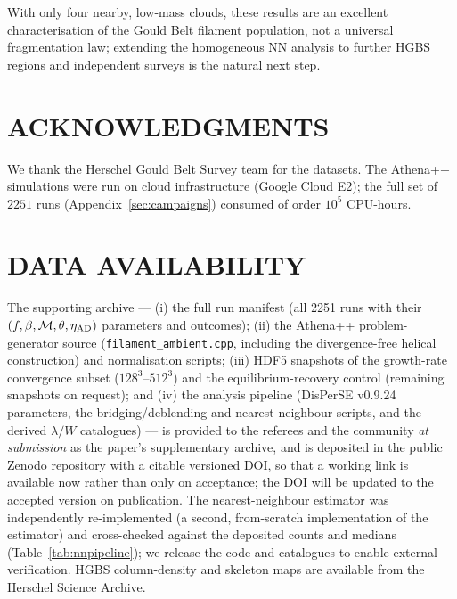 \documentclass[usenatbib,twoside,twocolumn]{mnras}
\begin{document}
\smallskip\noindent With only four nearby, low-mass clouds, these results are an excellent characterisation of the Gould Belt filament population, not a universal fragmentation law; extending the homogeneous NN analysis to further HGBS regions and independent surveys is the natural next step.

\section*{ACKNOWLEDGMENTS}

We thank the Herschel Gould Belt Survey team for the datasets. The Athena++ simulations were run on cloud infrastructure (Google Cloud E2); the full set of $2251$ runs (Appendix~\ref{sec:campaigns}) consumed of order $10^5$ CPU-hours.

\section*{DATA AVAILABILITY}

The supporting archive --- (i) the full run manifest (all 2251 runs with their $(f,\beta,\mathcal{M},\theta,\eta_{\rm AD})$ parameters and outcomes); (ii) the Athena++ problem-generator source (\texttt{filament\_ambient.cpp}, including the divergence-free helical construction) and normalisation scripts; (iii) HDF5 snapshots of the growth-rate convergence subset ($128^3$--$512^3$) and the equilibrium-recovery control (remaining snapshots on request); and (iv) the analysis pipeline (DisPerSE v0.9.24 parameters, the bridging/deblending and nearest-neighbour scripts, and the derived $\lambda/W$ catalogues) --- is provided to the referees and the community \emph{at submission} as the paper's supplementary archive, and is deposited in the public Zenodo repository with a citable versioned DOI, so that a working link is available now rather than only on acceptance; the DOI will be updated to the accepted version on publication. The nearest-neighbour estimator was independently re-implemented (a second, from-scratch implementation of the estimator) and cross-checked against the deposited counts and medians (Table~\ref{tab:nnpipeline}); we release the code and catalogues to enable external verification. HGBS column-density and skeleton maps are available from the Herschel Science Archive.


\appendix
\end{document}

